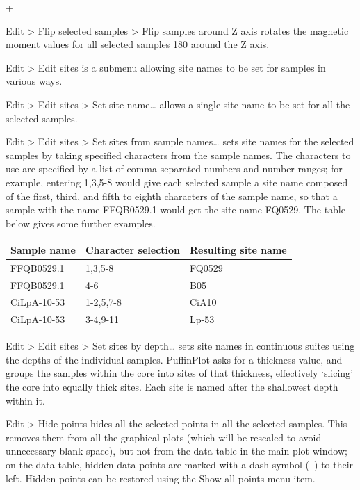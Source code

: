 \documentclass[a4paper,british]{article}
\newcommand{\menuitemlabel}[1]{%
\mbox{\textsf{#1}}\hfil}
\newenvironment{menuitemlist}%
{\begin{list}{}{%
\renewcommand{\makelabel}{\menuitemlabel}%
\setlength{\labelwidth}{35pt}%
\setlength{\leftmargin}%
             {\labelwidth+\labelsep}}}%
{\end{list}}
\newcommand{\ppcmd}[1]{\textsf{#1}} %
\newcommand{\submenu}{ \textgreater{} } %
\begin{document}
\begin{menuitemlist}
\item[Edit\submenu Flip selected samples\submenu Flip samples around Z axis]
  rotates the magnetic moment values for all selected samples 180\textdegree
  around the Z axis.

\item[Edit\submenu Edit sites] is a submenu allowing site names to be
  set for samples in various ways.

\item[Edit\submenu Edit sites\submenu Set site name\ldots] allows a single
  site name to be set for all the selected samples.

\item[Edit\submenu Edit sites\submenu Set sites from sample names\ldots] sets
  site names for the selected samples by taking specified characters from the
  sample names. The characters to use are specified by a list of
  comma-separated numbers and number ranges; for example, entering
  \ppcmd{1,3,5-8} would give each selected sample a site name composed of the
  first, third, and fifth to eighth characters of the sample name, so that
  a sample with the name \ppcmd{FFQB0529.1} would get the site name
  \ppcmd{FQ0529}. The table below gives some further examples.

\begin{tabular}{lll} \toprule
Sample name & Character selection & Resulting site name \\ \midrule
FFQB0529.1 & 1,3,5-8 & FQ0529 \\
FFQB0529.1 & 4-6 & B05 \\
CiLpA-10-53 & 1-2,5,7-8 & CiA10 \\
CiLpA-10-53 & 3-4,9-11 & Lp-53 \\
\bottomrule \end{tabular}

\item[Edit\submenu Edit sites\submenu Set sites by depth\ldots] sets site
  names in continuous suites using the depths of the individual samples.
  PuffinPlot asks for a thickness value, and groups the samples within the
  core into sites of that thickness, effectively `slicing' the core into
  equally thick sites. Each site is named after the shallowest depth within
  it.

\item[Edit\submenu Hide points] hides all the selected points in all the
  selected samples. This removes them from all the graphical plots (which
  will be rescaled to avoid unnecessary blank space), but not from the data
  table in the main plot window; on the data table, hidden data points are
  marked with a dash symbol (--) to their left. Hidden points can be restored
  using the \ppcmd{Show all points} menu item.


\end{menuitemlist}
\end{document}

